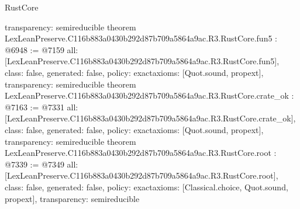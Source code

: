 \begin{lexlean}{RustCore}
\begin{coremodule}
{  transparency: semireducible
}
theorem LexLeanPreserve.C116b883a0430b292d87b709a5864a9ac.R3.RustCore.fun5 : @6948 := @7159 {
  all: [LexLeanPreserve.C116b883a0430b292d87b709a5864a9ac.R3.RustCore.fun5],
  class: false,
  generated: false,
  policy: exact{axioms: [Quot.sound, propext]},
  transparency: semireducible
}
theorem LexLeanPreserve.C116b883a0430b292d87b709a5864a9ac.R3.RustCore.crate_ok : @7163 := @7331 {
  all: [LexLeanPreserve.C116b883a0430b292d87b709a5864a9ac.R3.RustCore.crate_ok],
  class: false,
  generated: false,
  policy: exact{axioms: [Quot.sound, propext]},
  transparency: semireducible
}
theorem LexLeanPreserve.C116b883a0430b292d87b709a5864a9ac.R3.RustCore.root : @7339 := @7349 {
  all: [LexLeanPreserve.C116b883a0430b292d87b709a5864a9ac.R3.RustCore.root],
  class: false,
  generated: false,
  policy: exact{axioms: [Classical.choice, Quot.sound, propext]},
  transparency: semireducible
}


\end{coremodule}
\end{lexlean}
